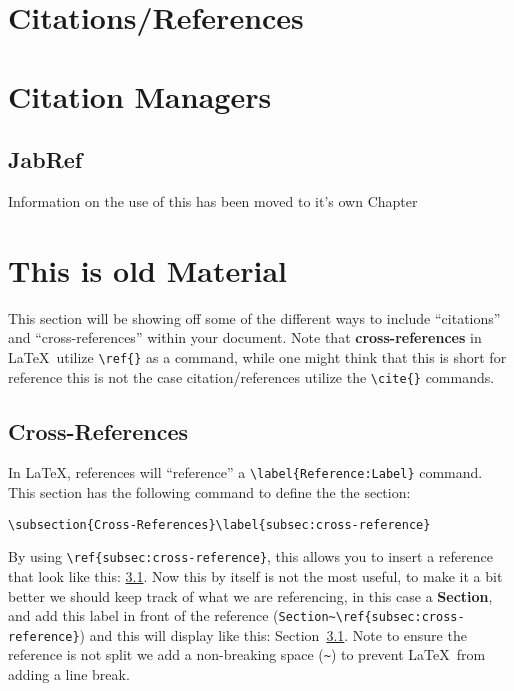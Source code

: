 	\section{Citations/References}
		
	
	\section{Citation Managers}
		
		\subsection{JabRef}
			Information on the use of this has been moved to it's own Chapter %
	\section{This is old Material}
	This section will be showing off some of the different ways to include \enquote{citations} and \enquote{cross-references} within your document.
		Note that \textbf{cross-references} in \LaTeX\ utilize \lstinline|\ref{}| as a command, while one might think that this is short for reference this is not the case citation/references utilize the \lstinline|\cite{}| commands.
		\subsection{Cross-References}\label{subsec:cross-reference}
			In \LaTeX, references will \enquote{reference} a \lstinline|\label{Reference:Label}| command. 
			This section has the following command to define the the section:
			\begin{Center}
				\lstinline|\subsection{Cross-References}\label{subsec:cross-reference}|
			\end{Center}
			By using \lstinline|\ref{subsec:cross-reference}|, this allows you to insert a reference that look like this: \ref{subsec:cross-reference}.
			Now this by itself is not the most useful, to make it a bit better we should keep track of what we are referencing, in this case a \textbf{Section}, and add this label in front of the reference (\lstinline|Section~\ref{subsec:cross-reference}|) and this will display like this: Section~\ref{subsec:cross-reference}.
			Note to ensure the reference is not split we add a non-breaking space (\lstinline|~|) to prevent \LaTeX\ from adding a line break.

